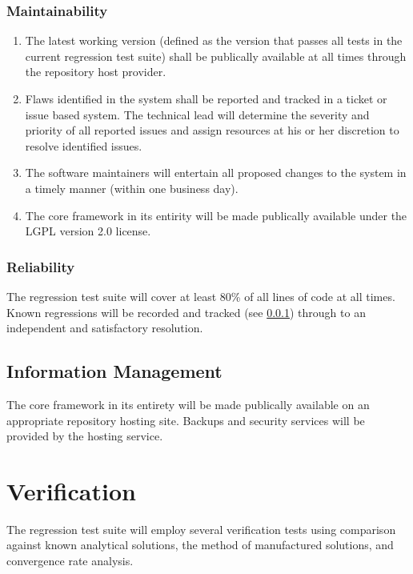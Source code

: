 \documentclass{INLreport}
\begin{document}
\subsubsection{Maintainability}
\label{Maintainability}
\begin{enumerate}
\item The latest working version (defined as the version that passes all tests in the current regression test suite)
      shall be publically available at all times through the repository host provider.
\item Flaws identified in the system shall be reported and tracked in a ticket or issue based system. The technical lead
      will determine the severity and priority of all reported issues and assign resources at his or her discretion to
      resolve identified issues.
\item The software maintainers will entertain all proposed changes to the system in a timely manner (within one business day).
\item The core framework in its entirity will be made publically available under the LGPL version 2.0 license.
\end{enumerate}

\subsubsection{Reliability}
The regression test suite will cover at least 80\% of all lines of code at all times. Known regressions will be recorded
and tracked (see \ref{Maintainability}) through to an independent and satisfactory resolution.

\subsection{Information Management}
The core framework in its entirety will be made publically available on an appropriate repository hosting site. Backups and
security services will be provided by the hosting service.

\section{Verification}

The regression test suite will employ several verification tests using comparison against known analytical solutions, the method of
manufactured solutions, and convergence rate analysis.


\end{document}
